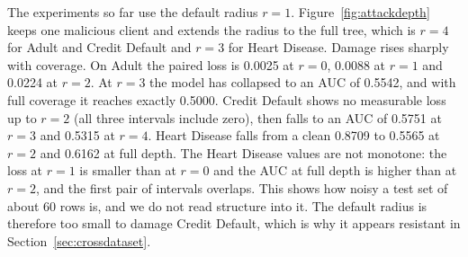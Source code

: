 \documentclass[11pt]{article}
\newcommand{\rev}[1]{#1}
\begin{document}
\rev{The experiments so far use the default radius $r=1$. Figure~\ref{fig:attackdepth} keeps one malicious client and extends the radius to the full tree, which is $r=4$ for Adult and Credit Default and $r=3$ for Heart Disease. Damage rises sharply with coverage. On Adult the paired loss is 0.0025 at $r=0$, 0.0088 at $r=1$ and 0.0224 at $r=2$. At $r=3$ the model has collapsed to an AUC of 0.5542, and with full coverage it reaches exactly 0.5000. Credit Default shows no measurable loss up to $r=2$ (all three intervals include zero), then falls to an AUC of 0.5751 at $r=3$ and 0.5315 at $r=4$. Heart Disease falls from a clean 0.8709 to 0.5565 at $r=2$ and 0.6162 at full depth. The Heart Disease values are not monotone: the loss at $r=1$ is smaller than at $r=0$ and the AUC at full depth is higher than at $r=2$, and the first pair of intervals overlaps. This shows how noisy a test set of about 60 rows is, and we do not read structure into it. The default radius is therefore too small to damage Credit Default, which is why it appears resistant in Section~\ref{sec:crossdataset}.}
\end{document}
